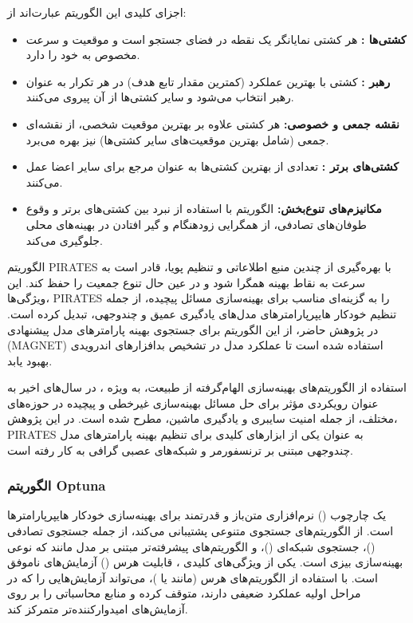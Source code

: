 اجزای کلیدی این الگوریتم عبارت‌اند از:
\begin{itemize}
    \item \textbf{کشتی‌ها :} هر کشتی نمایانگر یک نقطه در فضای جستجو است و موقعیت و سرعت مخصوص به خود را دارد.
    \item \textbf{رهبر :} کشتی با بهترین عملکرد (کمترین مقدار تابع هدف) در هر تکرار به عنوان رهبر انتخاب می‌شود و سایر کشتی‌ها از آن پیروی می‌کنند.
    \item \textbf{نقشه جمعی و خصوصی:} هر کشتی علاوه بر بهترین موقعیت شخصی، از نقشه‌ای جمعی (شامل بهترین موقعیت‌های سایر کشتی‌ها) نیز بهره می‌برد.
    \item \textbf{کشتی‌های برتر :} تعدادی از بهترین کشتی‌ها به عنوان مرجع برای سایر اعضا عمل می‌کنند.
    \item \textbf{مکانیزم‌های تنوع‌بخش:} الگوریتم با استفاده از نبرد بین کشتی‌های برتر و وقوع طوفان‌های تصادفی، از همگرایی زودهنگام و گیر افتادن در بهینه‌های محلی جلوگیری می‌کند.
\end{itemize}

الگوریتم PIRATES با بهره‌گیری از چندین منبع اطلاعاتی و تنظیم پویا، قادر است به سرعت به نقاط بهینه همگرا شود و در عین حال تنوع جمعیت را حفظ کند. این ویژگی‌ها، PIRATES را به گزینه‌ای مناسب برای بهینه‌سازی مسائل پیچیده، از جمله تنظیم خودکار هایپرپارامترهای مدل‌های یادگیری عمیق و چندوجهی، تبدیل کرده است. در پژوهش حاضر، از این الگوریتم برای جستجوی بهینه پارامترهای مدل پیشنهادی (MAGNET) استفاده شده است تا عملکرد مدل در تشخیص بدافزارهای اندرویدی بهبود یابد.

استفاده از الگوریتم‌های بهینه‌سازی الهام‌گرفته از طبیعت، به ویژه ، در سال‌های اخیر به عنوان رویکردی مؤثر برای حل مسائل بهینه‌سازی غیرخطی و پیچیده در حوزه‌های مختلف، از جمله امنیت سایبری و یادگیری ماشین، مطرح شده است. در این پژوهش، PIRATES به عنوان یکی از ابزارهای کلیدی برای تنظیم بهینه پارامترهای مدل چندوجهی مبتنی بر ترنسفورمر و شبکه‌های عصبی گرافی به کار رفته است.

\subsubsection{الگوریتم Optuna}
 \cite{Optuna2019} یک چارچوب () نرم‌افزاری متن‌باز و قدرتمند برای بهینه‌سازی خودکار هایپرپارامترها است.  از الگوریتم‌های جستجوی متنوعی پشتیبانی می‌کند، از جمله جستجوی تصادفی ()، جستجوی شبکه‌ای ()، و الگوریتم‌های پیشرفته‌تر مبتنی بر مدل مانند  که نوعی بهینه‌سازی بیزی است. یکی از ویژگی‌های کلیدی ، قابلیت هرس () آزمایش‌های ناموفق است. با استفاده از الگوریتم‌های هرس (مانند  یا )،  می‌تواند آزمایش‌هایی را که در مراحل اولیه عملکرد ضعیفی دارند، متوقف کرده و منابع محاسباتی را بر روی آزمایش‌های امیدوارکننده‌تر متمرکز کند.


